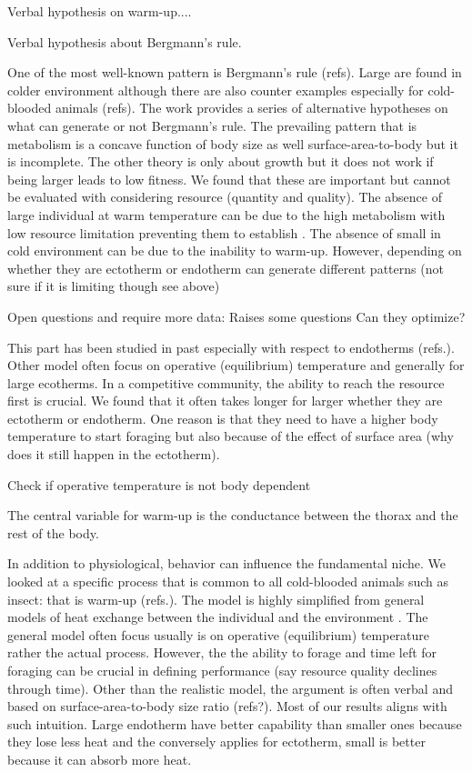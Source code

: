 Verbal hypothesis on warm-up....


Verbal hypothesis about Bergmann's rule.

One of the most well-known pattern is Bergmann's rule (refs).
Large are found in colder environment although there are also counter examples especially for cold-blooded animals (refs).
The work provides a series of alternative hypotheses on what can generate or not Bergmann's rule.
The prevailing pattern that is metabolism is a concave function of body size as well surface-area-to-body but it is incomplete.
The other theory is only about growth but it does not work if being larger leads to low fitness.
We found that these are important but cannot be evaluated with considering resource (quantity and quality).
The absence of large individual at warm temperature can be due to the high metabolism with low resource limitation preventing them to establish \citep{Angert2005}. 
The absence of small in cold environment can be due to the inability to warm-up.
However, depending on whether they are ectotherm or endotherm can generate different patterns (not sure if it is limiting though see above)


Open questions and require more data:
Raises some questions
Can they optimize?

This part has been studied in past especially with respect to endotherms (refs.).
Other model often focus on operative (equilibrium) temperature and generally for large ecotherms.
In a competitive community, the ability to reach the resource first is crucial.
We found that it often takes longer for larger whether they are ectotherm or endotherm.
One reason is that they need to have a higher body temperature to start foraging but also because of the effect of surface area (why does it still happen in the ectotherm).

Check if operative temperature is not body dependent



The central variable for warm-up is the conductance between the thorax and the rest of the body. 



In addition to physiological, behavior can influence the fundamental niche.
We looked at a specific process that is common to all cold-blooded animals such as insect: that is warm-up (refs.).
The model is highly simplified from general models of heat exchange between the individual and the environment \citep[e.g.,][]{Campbell2012}.
The general model often focus usually is on operative (equilibrium) temperature \citep[e.g.]{Angilletta2009} rather the actual process.
However, the the ability to forage and time left for foraging can be crucial in defining performance (say resource quality declines through time).
Other than the realistic model, the argument is often verbal and based on surface-area-to-body size ratio (refs?).
Most of our results aligns with  such intuition. 
Large endotherm have better capability than smaller ones because they lose less heat and the conversely applies for ectotherm, small is better because it can absorb more heat.


